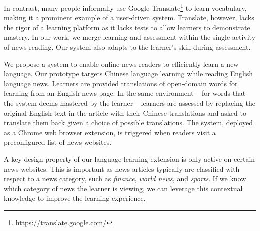 In contrast, many people informally use Google
Translate\footnote{\url{https://translate.google.com/}} to learn
vocabulary, making it a prominent example of a user-driven system.
Translate, however, lacks the rigor of a learning platform as it lacks
tests to allow learners to demonstrate mastery.  In our work, we merge
learning and assessment within the single activity of news reading.
Our system also adapts to the learner's skill during assessment.

We propose a system to enable online news readers to efficiently learn
a new language.  Our prototype targets Chinese language learning while
reading English language news. Learners are provided translations of
open-domain words for learning from an English news page. In the same
environment -- for words that the system deems mastered by the learner
-- learners are assessed by replacing the original English text in the
article with their Chinese translations and asked to translate them
back given a choice of possible translations.  The system, deployed as
a Chrome web browser extension, is triggered when readers visit a
preconfigured list of news websites.

A key design property of our language learning extension is only
active on certain news websites.  This is important as news articles
typically are classified with respect to a news category, such as {\it
  finance}, {\it world news}, and {\it sports}.  If we know which
category of news the learner is viewing, we can leverage this
contextual knowledge to improve the learning experience.

